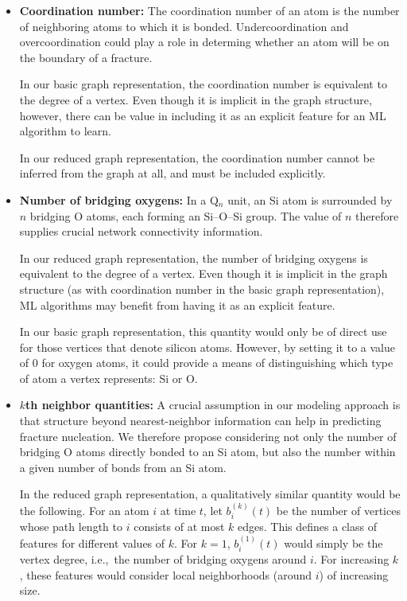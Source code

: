 \begin{itemize}
    \item \textbf{Coordination number:} The coordination number of an atom is the number of neighboring atoms to which it is bonded.  Undercoordination and overcoordination could play a role in determing whether an atom will be on the boundary of a fracture.
    
    In our basic graph representation, the coordination number is equivalent to the degree of a vertex.  Even though it is implicit in the graph structure, however, there can be value in including it as an explicit feature for an ML algorithm to learn.
    
    In our reduced graph representation, the coordination number cannot be inferred from the graph at all, and must be included explicitly.

    \item\textbf{Number of bridging oxygens:} In a Q$_n$ unit, an Si atom is surrounded by $n$ bridging O atoms, each forming an Si--O--Si group.  The value of $n$ therefore supplies crucial network connectivity information. 
    
    In our reduced graph representation, the number of bridging oxygens is equivalent to the degree of a vertex.  Even though it is implicit in the graph structure (as with coordination number in the basic graph representation), ML algorithms may benefit from having it as an explicit feature.
    
    In our basic graph representation, this quantity would only be of direct use for those vertices that denote silicon atoms.  However, by setting it to a value of 0 for oxygen atoms, it could provide a means of distinguishing which type of atom a vertex represents: Si or O.

    \item\textbf{$k$th neighbor quantities:} A crucial assumption in our modeling approach is that structure beyond nearest-neighbor information can help in predicting fracture nucleation.  We therefore propose considering not only the number of bridging O atoms directly bonded to an Si atom, but also the number within a given number of bonds from an Si atom.
    
    In the reduced graph representation, a qualitatively similar quantity would be the following.  For an atom $i$ at time $t$, let $b^{(k)}_i(t)$ be the number of vertices whose path length to $i$ consists of at most $k$ edges. This defines a class of features for different values of $k$.  For $k=1$, $b^{(1)}_i(t)$ would simply be the vertex degree, i.e.,\ the number of bridging oxygens around $i$.  For increasing $k$, these features would consider local neighborhoods (around $i$) of increasing size.
    
\end{itemize}

